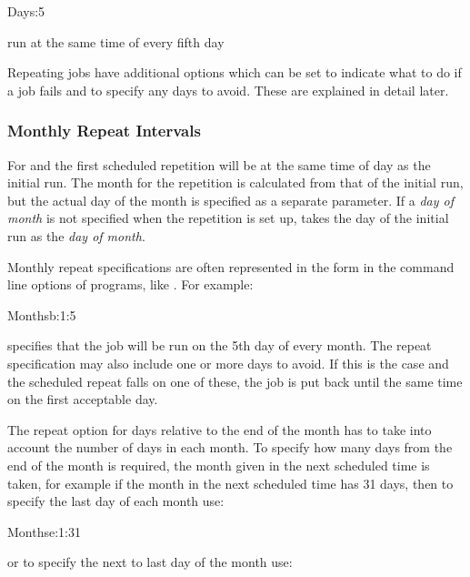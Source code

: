 \begin{expara}

Days:5

\end{expara}

run at the same time of every fifth day

Repeating jobs have additional options which can be set to indicate what to do if a job fails and to specify any days to avoid. These are
explained in detail later.

\subsubsection{Monthly Repeat Intervals}
For  and  the first scheduled repetition will be at the same time of day as the
initial run. The month for the repetition is calculated from that of the initial run, but the actual day of the month is specified as a
separate parameter. If a \textit{day of month} is not specified when the repetition is set up, \ProductName{} takes the day of the initial run as
the \textit{day of month}.

Monthly repeat specifications are often represented in the form  in the command line options
of programs, like \PrBtr{}. For example:

\begin{expara}

Monthsb:1:5

\end{expara}

specifies that the job will be run on the 5th day of every month. The repeat specification may also include one or more days to avoid. If
this is the case and the scheduled repeat falls on one of these, the job is put back until the same time on the first acceptable day.

The repeat option for days relative to the end of the month has to take into account the number of days in each month. To specify how many days
from the end of the month is required, the month given in the next scheduled time is taken, for example if the month in the next scheduled
time has 31 days, then to specify the last day of each month use:

\begin{expara}

Monthse:1:31

\end{expara}

or to specify the next to last day of the month use:

